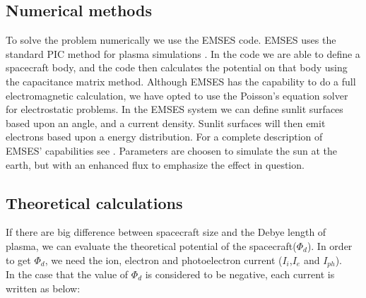 \subsection{Numerical methods}

To solve the problem numerically we use the EMSES code. EMSES uses the standard PIC method for plasma simulations \citep{birdsall2004plasma}.
In the code we are able to define a spacecraft body, and the code then calculates the potential on that body using the capacitance matrix method.
Although EMSES has the capability to do a full electromagnetic calculation, we have opted to use the Poisson's equation
solver for electrostatic problems. In the EMSES system we can define sunlit surfaces based upon an angle, and a current
density. Sunlit surfaces will then emit electrons based upon a energy distribution. For a complete description of EMSES' capabilities
see \citep{nakashima_ohhelp:_2009}. Parameters are choosen to simulate the sun at the earth, but with an enhanced flux to emphasize the effect in question.

\subsection{Theoretical calculations}
\label{sec:theo_calc}

If there are big difference between spacecraft size and the Debye length of plasma, we can evaluate the theoretical potential of the spacecraft($\Phi_d$). In order to get $\Phi_d$, we need the ion, electron and photoelectron current (\(I_i\),\(I_e\) and \(I_{ph}\)).\\
In the case that the value of $\Phi_d$ is considered to be negative, each current is written as below:

